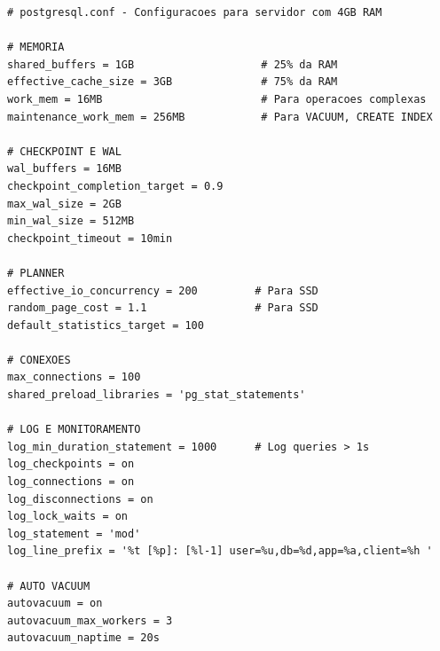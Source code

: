 \begin{lstlisting}[caption=Configuracoes recomendadas do PostgreSQL]
# postgresql.conf - Configuracoes para servidor com 4GB RAM

# MEMORIA
shared_buffers = 1GB                    # 25% da RAM
effective_cache_size = 3GB              # 75% da RAM
work_mem = 16MB                         # Para operacoes complexas
maintenance_work_mem = 256MB            # Para VACUUM, CREATE INDEX

# CHECKPOINT E WAL
wal_buffers = 16MB
checkpoint_completion_target = 0.9
max_wal_size = 2GB
min_wal_size = 512MB
checkpoint_timeout = 10min

# PLANNER
effective_io_concurrency = 200         # Para SSD
random_page_cost = 1.1                 # Para SSD
default_statistics_target = 100

# CONEXOES
max_connections = 100
shared_preload_libraries = 'pg_stat_statements'

# LOG E MONITORAMENTO
log_min_duration_statement = 1000      # Log queries > 1s
log_checkpoints = on
log_connections = on
log_disconnections = on
log_lock_waits = on
log_statement = 'mod'
log_line_prefix = '%t [%p]: [%l-1] user=%u,db=%d,app=%a,client=%h '

# AUTO VACUUM
autovacuum = on
autovacuum_max_workers = 3
autovacuum_naptime = 20s
\end{lstlisting}
